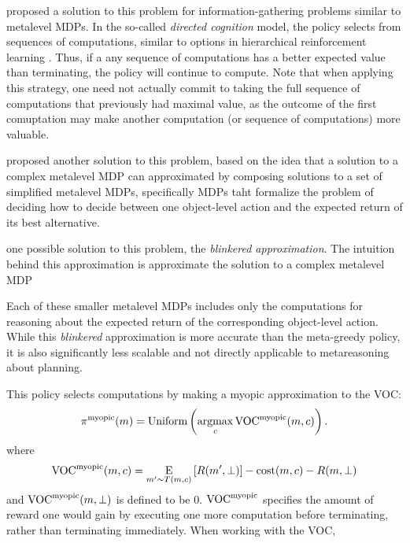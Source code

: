 \citet{gabaix2005bounded} proposed a solution to this problem for information-gathering problems similar to metalevel MDPs. In the so-called \emph{directed cognition} model, the policy selects from sequences of computations, similar to options in hierarchical reinforcement learning \citep{sutton1999mdps}. Thus, if a any sequence of computations has a better expected value than terminating, the policy will continue to compute. Note that when applying this strategy, one need not actually commit to taking the full sequence of computations that previously had maximal value, as the outcome of the first comuptation may make another computation (or sequence of computations) more valuable.

\citet{hay2012selecting} proposed another solution to this problem, based on the idea that a solution to a complex metalevel MDP can approximated by composing solutions to a set of simplified metalevel MDPs, specifically MDPs taht formalize the problem of deciding how to decide between one object-level action and the expected return of its best alternative.

one possible solution to this problem, the \emph{blinkered approximation}. The intuition behind this approximation is approximate the solution to a complex metalevel MDP 


Each of these smaller metalevel MDPs includes only the computations for reasoning about the expected return of the corresponding object-level action.
While this \textit{blinkered} approximation is more accurate than the meta-greedy policy, it is also significantly less scalable and not directly applicable to metareasoning about planning.



This policy selects computations by making a myopic approximation to the VOC:
\begin{equation}
\pi^{\mathrm{myopic}}(m) = \text{Uniform}\left(\operatorname*{argmax}_c \text{VOC}^{\mathrm{myopic}}(m, c)\right).
\end{equation}
where
\begin{equation*}
  \text{VOC}^{\mathrm{myopic}}(m,c) = \operatorname*{E}_{m' \sim T(m, c)}\left[
    R(m',\bot)
  \right] - \text{cost}(m,c) - R(m, \bot)
\end{equation*}
and $\text{VOC}^{\mathrm{myopic}}(m,\bot)$ is defined to be 0. $\text{VOC}^{\mathrm{myopic}}$ specifies the amount of reward one would gain by executing one more computation before terminating, rather than terminating immediately. When working with the VOC, 



